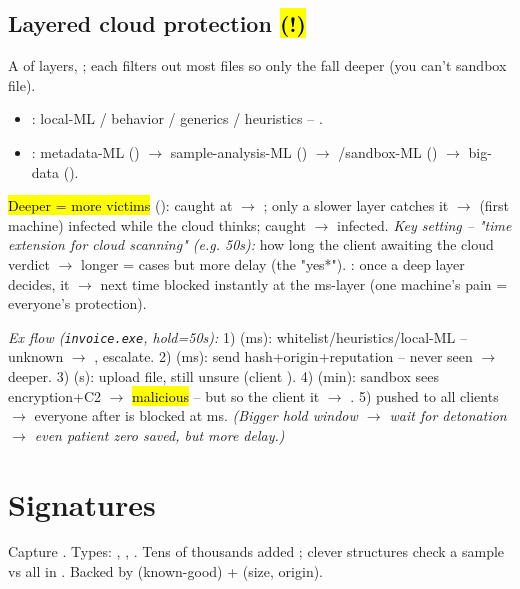 \subsection{Layered cloud protection \hl{(!)}}
A  of layers, ; each filters out most files so only the  fall deeper (you can't sandbox  file).
\begin{itemize}
\item {}: local-ML / behavior / generics / heuristics -- .
\item {}: metadata-ML () $\to$ sample-analysis-ML () $\to$ /sandbox-ML () $\to$ big-data ().
\end{itemize}
\hl{Deeper = more victims} (): caught at  $\to$ ; only a slower layer catches it $\to$  (first machine) infected while the cloud thinks;  caught $\to$  infected.
\textit{Key setting -- "time extension for cloud scanning" (e.g. 50s):} how long the client  awaiting the cloud verdict $\to$ longer =  cases but more delay (the "yes*").
: once a deep layer decides, it  $\to$ next time blocked instantly at the ms-layer (one machine's pain = everyone's protection).

\textit{Ex flow (\texttt{invoice.exe}, hold=50s):} 1)  (ms): whitelist/heuristics/local-ML -- unknown $\to$ , escalate. 2)  (ms): send hash+origin+reputation -- never seen $\to$ deeper. 3)  (s): upload file, still unsure (client ). 4)  (min): sandbox sees encryption+C2 $\to$ \hl{malicious} -- but  so the client  it $\to$ . 5)  pushed to all clients $\to$ everyone after is blocked at ms. \textit{(Bigger hold window $\to$ wait for detonation $\to$ even patient zero saved, but more delay.)}

\section{Signatures}
Capture . Types: , , . Tens of thousands added ; clever structures check a sample vs all in . Backed by  (known-good) +  (size, origin).

